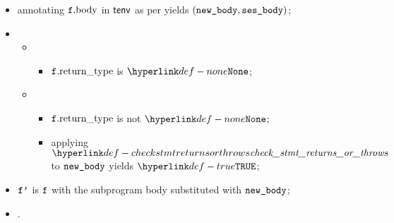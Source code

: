 \ProseParagraph
\AllApply
\begin{itemize}
  \item annotating $\vf.\funcbody$ in $\tenv$ as per  yields $(\newbody, \vsesbody)$\ProseOrTypeError;
  \item \OneApplies
  \begin{itemize}
    \item {}
    \begin{itemize}
      \item $\vf.\funcreturntype$ is $\None$;
    \end{itemize}

    \item {}
    \begin{itemize}
      \item $\vf.\funcreturntype$ is not $\None$;
      \item applying $\checkstmtreturnsorthrows$ to $\newbody$ yields $\True$\ProseOrTypeError;
    \end{itemize}
  \end{itemize}
  \item $\vfp$ is $\vf$ with the subprogram body substituted with $\newbody$;
  \item {}.
\end{itemize}

\FormallyParagraph
\begin{mathpar}
\end{mathpar}

